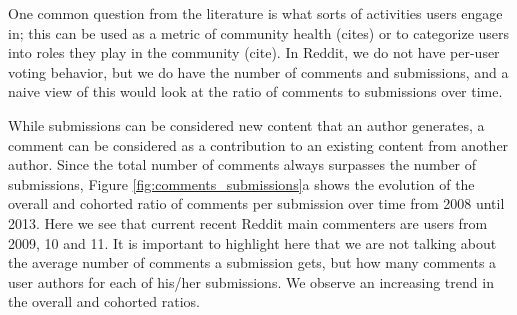 \begin{figure*}[!tb]
\centering
{}
\caption{Figure (a) shows the average comment per submission ratio over clock time and Figure (b) from the user-referential time. Both figures show the cohorted trends and the overall users trends. Figure (c), just as in Figure \ref{fig:avr_posts_per_user_for_surviving_year}, correspond to the cohorts of 2010, 11 and 12. They show the average comment per submission ratio for users segmented by the number of years that the user survived in the network.}
\label{fig:comments_submissions}
\end{figure*}

One common question from the literature is what sorts of activities users engage in; this can be used as a metric of community health (cites) or to categorize users into roles they play in the community (cite).  In Reddit, we do not have per-user voting behavior, but we do have the number of comments and submissions, and a naive view of this would look at the ratio of comments to submissions over time.

While submissions can be considered new content that an author generates, a comment can be considered as a contribution to an existing content from another author. Since the total number of comments always surpasses the number of submissions, Figure \ref{fig:comments_submissions}a shows the evolution of the overall and cohorted ratio of comments per submission over time from 2008 until 2013. Here we see that current recent Reddit main commenters are users from 2009, 10 and 11. It is important to highlight here that we are not talking about the average number of comments a submission gets, but how many comments a user authors for each of his/her submissions. We observe an increasing trend in the overall and cohorted ratios.

